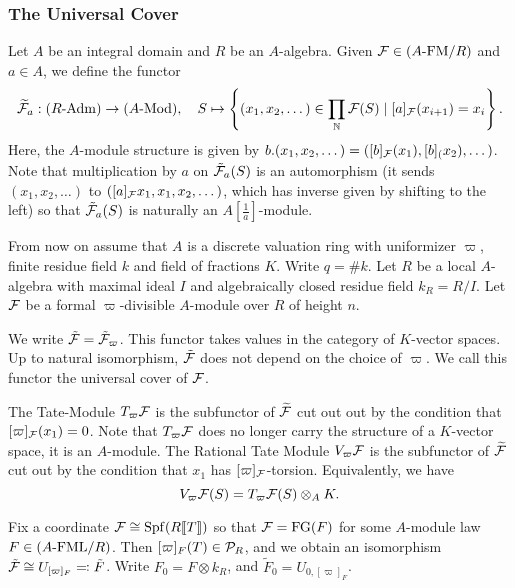 \documentclass[../main.tex]{subfiles}
\begin{document}
\subsubsection{The Universal Cover} %
\label{ssub:The Universal Cover}
Let $A$ be an integral domain and $R$ be an $A$-algebra. Given $\mathcal{F} \in {({A}\text-\allowbreak\mathrm{FM}/{R})}$ and $a \in A$,
we define the functor 
\begin{equation*}
  \widetilde{\mathcal{F}}_a : {({R}\text-\allowbreak\mathrm{Adm})} \to {({A}\text-\allowbreak\mathrm{Mod})}, \quad
  S \mapsto \left\{(x_1, x_2, \dots) \in \prod_{\mathbb{N}} \mathcal{F}(S) \mid [a]_{\mathcal{F}}(x_{i+1}) =
  x_i \right\}.
\end{equation*}
Here, the $A$-module structure is given by $b.(x_1, x_2,\dots) = ([b]_{\mathcal{F}}(x_1), [b]_(x_2),
\dots)$. Note that multiplication by $a$ on $\tilde {\mathcal{F}}_a(S)$ is an automorphism
(it sends $(x_1, x_2, \dots)$ to $([a]_{\mathcal{F}} x_1, x_1, x_2, \dots)$, which has inverse given
by shifting to the left)  so that $\tilde {\mathcal{F}}_a(S)$ is naturally an
$A[\frac1a]$-module.

From now on assume that $A$ is a discrete valuation ring with uniformizer
$\varpi$, finite residue field $k$ and field of fractions $K$. 
Write $q = \# k$. Let $R$ be a local $A$-algebra with maximal ideal $I$ and
algebraically closed residue field $k_R = R/I$. Let $\mathcal{F}$ be a formal
$\varpi$-divisible $A$-module over $R$ of height $n$. 
\begin{defi}
  We write $\tilde {\mathcal{F}} = \tilde {\mathcal{F}}_\varpi$. This functor
  takes values in the category of $K$-vector spaces.
  Up to natural isomorphism, $\tilde {\mathcal{F}}$ does not depend on the choice of 
  $\varpi$. We call this functor the universal cover of $\mathcal{F}$. 

  The Tate-Module $T_\varpi \mathcal{F}$ is the subfunctor of $\widetilde{\mathcal{F}}$ cut out out
  by the condition that $[\varpi]_{\mathcal{F}}(x_1) = 0$. Note that $T_\varpi \mathcal{F}$ does no longer 
  carry the structure of a $K$-vector space, it is an $A$-module. The Rational
  Tate Module $V_\varpi \mathcal{F}$ is the subfunctor of $\widetilde{\mathcal{F}}$ cut out by the
  condition that $x_1$ has $[\varpi]_{\mathcal{F}}$-torsion. Equivalently, we have 
  \begin{equation*}
    V_\varpi \mathcal{F} (S) = T_\varpi \mathcal{F}(S) \otimes_A K.
  \end{equation*}
\end{defi}

Fix a coordinate $\mathcal{F} \cong \operatorname{Spf}(R\llbracket T \rrbracket)$ so that $\mathcal{F} = \textnormal{FG}(F)$ for
some $A$-module law $F \in {({A}\text-\allowbreak\mathrm{FML}/{R})}$. Then $[\varpi]_F(T) \in \mathcal{P}_R$, and
we obtain an isomorphism $\tilde {\mathcal{F}} \cong U_{[\varpi]_F} \eqqcolon \tilde F$.
Write $F_0 = F \otimes k_R$, and $\tilde F_0 = U_{0, [\varpi]_F}$. 
\end{document}
